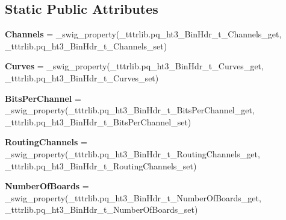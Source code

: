 \subsection*{Static Public Attributes}
\begin{DoxyCompactItemize}
\item 
\mbox{\label{classtttrlib_1_1pq__ht3___bin_hdr__t_a5318adb4558839c6008a1d27e10f2733}} 
{\bfseries Channels} = \+\_\+swig\+\_\+property(\+\_\+tttrlib.\+pq\+\_\+ht3\+\_\+\+Bin\+Hdr\+\_\+t\+\_\+\+Channels\+\_\+get, \+\_\+tttrlib.\+pq\+\_\+ht3\+\_\+\+Bin\+Hdr\+\_\+t\+\_\+\+Channels\+\_\+set)
\item 
\mbox{\label{classtttrlib_1_1pq__ht3___bin_hdr__t_a3be7cb88235a304d891ddad73d7021f4}} 
{\bfseries Curves} = \+\_\+swig\+\_\+property(\+\_\+tttrlib.\+pq\+\_\+ht3\+\_\+\+Bin\+Hdr\+\_\+t\+\_\+\+Curves\+\_\+get, \+\_\+tttrlib.\+pq\+\_\+ht3\+\_\+\+Bin\+Hdr\+\_\+t\+\_\+\+Curves\+\_\+set)
\item 
\mbox{\label{classtttrlib_1_1pq__ht3___bin_hdr__t_a204be723ffa5d799236fa2f587469238}} 
{\bfseries Bits\+Per\+Channel} = \+\_\+swig\+\_\+property(\+\_\+tttrlib.\+pq\+\_\+ht3\+\_\+\+Bin\+Hdr\+\_\+t\+\_\+\+Bits\+Per\+Channel\+\_\+get, \+\_\+tttrlib.\+pq\+\_\+ht3\+\_\+\+Bin\+Hdr\+\_\+t\+\_\+\+Bits\+Per\+Channel\+\_\+set)
\item 
\mbox{\label{classtttrlib_1_1pq__ht3___bin_hdr__t_a0999ab6caa91e3a89eab8dc5ba16c7b6}} 
{\bfseries Routing\+Channels} = \+\_\+swig\+\_\+property(\+\_\+tttrlib.\+pq\+\_\+ht3\+\_\+\+Bin\+Hdr\+\_\+t\+\_\+\+Routing\+Channels\+\_\+get, \+\_\+tttrlib.\+pq\+\_\+ht3\+\_\+\+Bin\+Hdr\+\_\+t\+\_\+\+Routing\+Channels\+\_\+set)
\item 
\mbox{\label{classtttrlib_1_1pq__ht3___bin_hdr__t_a50d766b103cf67dd9fa1a3ec8787bf17}} 
{\bfseries Number\+Of\+Boards} = \+\_\+swig\+\_\+property(\+\_\+tttrlib.\+pq\+\_\+ht3\+\_\+\+Bin\+Hdr\+\_\+t\+\_\+\+Number\+Of\+Boards\+\_\+get, \+\_\+tttrlib.\+pq\+\_\+ht3\+\_\+\+Bin\+Hdr\+\_\+t\+\_\+\+Number\+Of\+Boards\+\_\+set)
\item 
\mbox{\label{classtttrlib_1_1pq__ht3___bin_hdr__t_a2131d148af24ed8179521b1c4719f162}} 

\end{DoxyCompactItemize}
